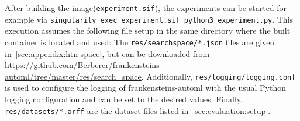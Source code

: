 After building the image(\texttt{experiment.sif}), the experiments can be started for example via \texttt{singularity exec experiment.sif python3 experiment.py}.\newline
This execution assumes the following file setup in the same directory where the built container is located and used:
The \texttt{res/searchspace/*.json} files are given in~\ref{sec:appendix:htn-space}, but can be downloaded from \url{https://github.com/Berberer/frankensteins-automl/tree/master/res/search_space}.
Additionally, \texttt{res/logging/logging.conf} is used to configure the logging of frankensteins-automl with the usual Python logging configuration and can be set to the desired values.
Finally, \texttt{res/datasets/*.arff} are the dataset files listed in~\ref{sec:evaluation:setup}.
